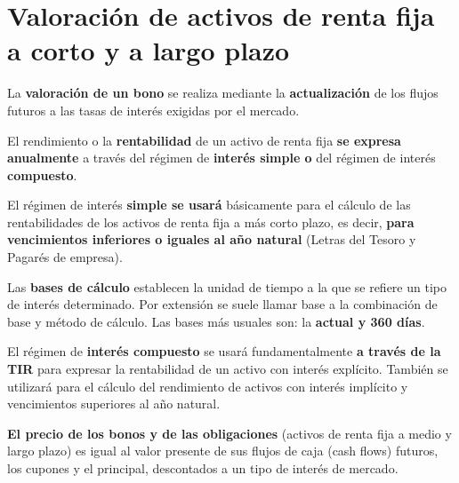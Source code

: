 \documentclass[
  letterpaper,
  DIV=11,
  numbers=noendperiod]{scrartcl}
\begin{document}
\hypertarget{valoraciuxf3n-de-activos-de-renta-fija-a-corto-y-a-largo-plazo}{%
\section{Valoración de activos de renta fija a corto y a largo
plazo}\label{valoraciuxf3n-de-activos-de-renta-fija-a-corto-y-a-largo-plazo}}

La \textbf{valoración de un bono} se realiza mediante la
\textbf{actualización} de los flujos futuros a las tasas de interés
exigidas por el mercado.

El rendimiento o la \textbf{rentabilidad} de un activo de renta fija
\textbf{se expresa anualmente} a través del régimen de \textbf{interés
simple o} del régimen de interés \textbf{compuesto}.

El régimen de interés \textbf{simple se usará} básicamente para el
cálculo de las rentabilidades de los activos de renta fija a más corto
plazo, es decir, \textbf{para vencimientos inferiores o iguales al año
natural} (Letras del Tesoro y Pagarés de empresa).

Las \textbf{bases de cálculo} establecen la unidad de tiempo a la que se
refiere un tipo de interés determinado. Por extensión se suele llamar
base a la combinación de base y método de cálculo. Las bases más usuales
son: la \textbf{actual y 360 días}.

El régimen de \textbf{interés compuesto} se usará fundamentalmente
\textbf{a través de la TIR} para expresar la rentabilidad de un activo
con interés explícito. También se utilizará para el cálculo del
rendimiento de activos con interés implícito y vencimientos superiores
al año natural.

\textbf{El precio de los bonos y de las obligaciones} (activos de renta
fija a medio y largo plazo) es igual al valor presente de sus flujos de
caja (cash flows) futuros, los cupones y el principal, descontados a un
tipo de interés de mercado.
\end{document}
